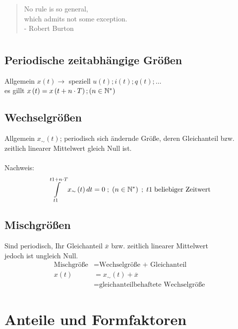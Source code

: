  \begin{quote}
  No rule is so general,\\which admits not some exception.\\- Robert Burton
 \end{quote}
 
\section{}%

\subsection*{Periodische zeitabhängige Größen}
Allgemein \(x\left(t\right) \xrightarrow{}\) speziell \(u\left(t\right); i\left(t\right); q\left(t\right); \dots\) \\
es gillt \(x\left(t\right) = x\left(t + n \cdot T\right) ; \left(n \in \mathbb{N}^* \right) \)

\subsection*{Wechselgrößen}
Allgemein \(x_{\sim} \left(t\right)\); periodisch sich ändernde Größe, deren Gleichanteil bzw. 
zeitlich linearer Mittelwert gleich Null ist. \\ \vspace{0mm} \\
Nachweis: \[\int\limits_{t1}^{t1 + n \cdot T} x_{\sim} \left(t\right)dt = 0 \; ; \; \left(n \in \mathbb{N}^* \right) \;
; \; t1 \; \text{beliebiger Zeitwert}\]

\subsection*{Mischgrößen}
Sind periodisch, Ihr Gleichanteil \(\overline{x}\) bzw. zeitlich linearer Mittelwert \\
jedoch ist ungleich Null. 
\begin{align*}
\text{Mischgröße} &= \text{Wechselgröße + Gleichanteil} \\
x\left(t\right) &= x_{\sim}\left(t\right) + \overline{x} \\
&= \text{gleichanteilbehaftete Wechselgröße}
\end{align*}

\section{Anteile und Formfaktoren}

